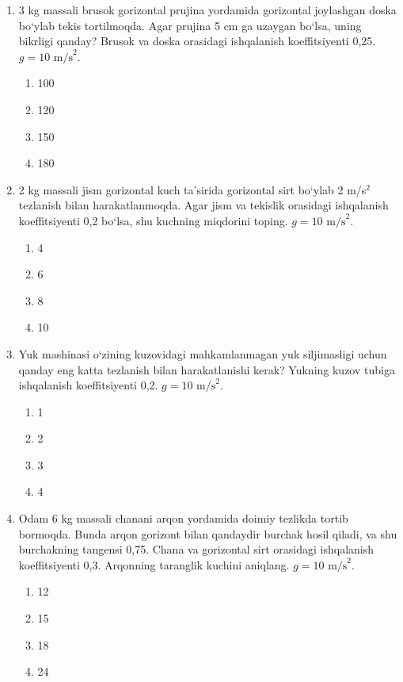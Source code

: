 \begin{enumerate}
\item 3 kg massali brusok gorizontal prujina yordamida
gorizontal joylashgan doska bo‘ylab tekis tortilmoqda.
Agar prujina 5 cm ga uzaygan bo‘lsa, uning bikrligi qanday?
Brusok va doska orasidagi ishqalanish koeffitsiyenti 0,25.
$g=10\text{ m/s}^2$.

\begin{enumerate}[label=\Alph*)]
\item 100
\item 120
\item 150
\item 180
\end{enumerate}

\item 2 kg massali jism gorizontal kuch ta’sirida
gorizontal sirt bo‘ylab 2 m/s$^2$ tezlanish bilan
harakatlanmoqda. Agar jism va tekislik orasidagi
ishqalanish koeffitsiyenti 0,2 bo‘lsa,
shu kuchning miqdorini toping.
$g=10\text{ m/s}^2$.

\begin{enumerate}[label=\Alph*)]
\item 4
\item 6
\item 8
\item 10
\end{enumerate}

\item Yuk mashinasi o‘zining kuzovidagi mahkamlanmagan
yuk siljimasligi uchun qanday eng katta tezlanish bilan
harakatlanishi kerak? Yukning kuzov tubiga
ishqalanish koeffitsiyenti 0,2.
$g=10\text{ m/s}^2$.

\begin{enumerate}[label=\Alph*)]
\item 1
\item 2
\item 3
\item 4
\end{enumerate}

\item Odam 6 kg massali chanani arqon yordamida
doimiy tezlikda tortib bormoqda.
Bunda arqon gorizont bilan qandaydir burchak hosil qiladi,
va shu burchakning tangensi 0,75.
Chana va gorizontal sirt orasidagi
ishqalanish koeffitsiyenti 0,3.
Arqonning taranglik kuchini aniqlang.
$g=10\text{ m/s}^2$.

\begin{enumerate}[label=\Alph*)]
\item 12
\item 15
\item 18
\item 24
\end{enumerate}


\end{enumerate}
